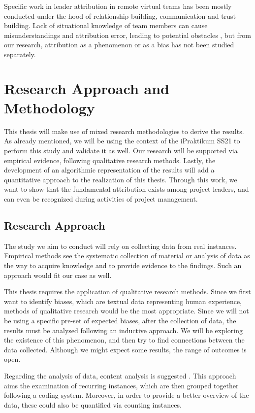 \documentclass[a4paper]{article}
\begin{document}
Specific work in leader attribution in remote virtual teams has been mostly conducted under the hood of relationship building, communication and trust building. Lack of situational knowledge of team members can cause misunderstandings and attribution error, leading to potential obstacles  \cite{Pauleen2005}, but from our research, attribution as a phenomenon or as a bias has not been studied separately.

\section{Research Approach and Methodology}

This thesis will make use of mixed research methodologies to derive the results. As already mentioned, we will be using the context of the iPraktikum SS21 to perform this study and validate it as well. Our research will be supported via empirical evidence, following qualitative research methods. Lastly, the development of an algorithmic representation of the results will add a quantitative approach to the realization of this thesis. Through this work, we want to show that the fundamental attribution exists among project leaders, and can even be recognized during activities of project management. 

\subsection{Research Approach} 

The study we aim to conduct will rely on collecting data from real instances. Empirical methods see the systematic collection of material or analysis of data as the way to acquire knowledge and to provide evidence to the findings. Such an approach would fit our case as well.

This thesis requires the application of qualitative research methods. Since we first want to identify biases, which are textual data representing human experience, methods of qualitative research would be the most appropriate. Since we will not be using a specific pre-set of expected biases, after the collection of data, the results must be analysed following an inductive approach. We will be exploring the existence of this phenomenon, and then try to find connections between the data collected. Although we might expect some results, the range of outcomes is open.

Regarding the analysis of data, content analysis is suggested \cite{Silverman2011}. This approach aims the examination of recurring instances, which are then grouped together following a coding system. Moreover, in order to provide a better overview of the data, these could also be quantified via counting instances. 
\end{document}
